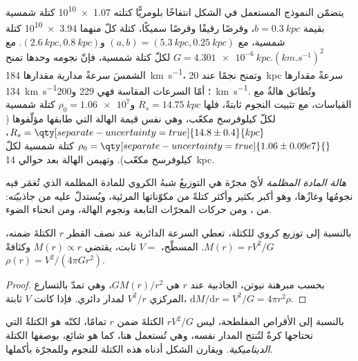 يتضمّن النموذج المستعمل في الشكل انتفاخًا بلومريًّا كتلته
\num{1.07e10} كتلة شمسية بقيمة $b = \qty{0.3}{kpc}$، وقرصًا رقيقًا وقرصًا
سميكًا، كتلة كلّ منهما \num{3.94e10} كتلة شمسية، مع $(a, b) =
(\qty{5.3}{kpc}, \qty{0.25}{kpc})$ و$(\qty{2.6}{kpc}, \qty{0.8}{kpc})$.
مع $G = \qty{4.301e-6}{kpc.(km.s^{-1})^2}$ لكلّ كتلة شمسية، فإنّ نجومه
وحدها تمنح الشمسَ سرعةً مدارية مقدارها \qty{184}{km.s^{-1}}، وتمنح نجمًا
عند \qty{20}{kpc} سرعةً مقدارها \qty{134}{km.s^{-1}}؛ أمّا السرعات المقاسة فهي
229 و\qty{200}{km.s^{-1}}. وتُطابَق هالةٌ مع القياسات، مع تثبيت
النجوم ثابتةً، فلها $R_s = \qty{14.75}{kpc}$
و$\rho_0 = \num{1.06e7}$ كتلة شمسية لكلّ كيلوفرسخ مكعّب، وهي نفس
قيمة الهالة التي طابقها مؤلّفوها ($R_s = \qty[separate-uncertainty=true]{14.8 \pm 0.4}{kpc}$،
$\rho_0 = \qty[separate-uncertainty=true]{1.06 \pm 0.09 e7}{}$ كتلة شمسية
لكلّ كيلوفرسخ مكعّب). وتهيمن الهالة بعد حوالي \qty{14}{kpc}.

\begin{definition}\label{def:b3:milky-way-galaxies:halo}
\emph{هالة المادة المظلمة} لأيّ مجرّة هي
التوزيعُ شبهُ الكروي للمادة المظلمة الذي تُغمَر فيه نجومُها وغازُها،
وهو أكبر بكثير وأكثر كتلةً من مكوّناتها المرئية،
ويُستدلّ عليه من جاذبيّته: من ، ومن حركات
المجرّات التابعة ونجوم الهالة، ومن انحناء الضوء.
\end{definition}

\begin{theorem}\label{thm:b3:milky-way-galaxies:enclosed}
بالنسبة إلى توزيع كروي للكتلة، تعطي السرعة الدائرية عند نصف القطر $r$
الكتلةَ ضمنه، $M(r) = rV^2/G$.  المسطّح،
$V = $ ثابت، يقتضي $M(r) \propto r$ وكثافةً
$\rho(r) = V^2/(4\pi G r^2)$.
\end{theorem}

\begin{proof}
بحسب مبرهنة نيوتن، الجاذبية عند $r$ هي $GM(r)/r^2$، وهي تمدّ
بالتسارع المركزي $V^2/r$ لمدار دائري. فإذا كانت $V$ ثابتة،
$\mathrm{d}M/\mathrm{d}r = V^2/G = 4\pi r^2\rho$.
\end{proof}

بالنسبة إلى الأقراص المفلطحة، ليس $rV^2/G$ الكتلةَ ضمن $r$ تمامًا، لكنّه
هو الكتلةُ التي تحتاجها كرةٌ لتُنتج المدار نفسه، وهي تُستعمل هنا،
كما هو شائع، بوصفها الكتلة \emph{الديناميكية}. ويقارن الشكل أدناه
هذه الكتلة للنجوم وللمجرّة بأكملها.

